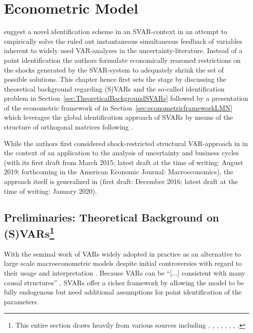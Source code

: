 \documentclass[a4paper,11pt,listof=nochaptergap,oneside,pointednumbers,bibtotoc,bigheadings,liststotoc,hidelinks]{scrbook}
\theoremstyle{mysatz}
\theoremstyle{mydefinition}
\theoremstyle{mytheorem}
\theoremstyle{mybemerkung}
\begin{document}
\chapter{Econometric Model}
\label{EconometricModel}
\citet{ludvigsonetal:18} suggest a novel identification scheme in an SVAR-context in an attempt to empirically solve the ruled out instantaneous simultaneous feedback of variables inherent to widely used VAR-analyses in the uncertainty-literature. Instead of a point identification the authors formulate economically reasoned restrictions on the shocks generated by the SVAR-system to adequately shrink the set of possible solutions. This chapter hence first sets the stage by discussing the theoretical background regarding (S)VARs and the so-called identification problem in Section~\ref{sec:TheoreticalBackgroundSVARs} followed by a presentation of the econometric framework of \citet{ludvigsonetal:18} in Section~\ref{sec:econometricframeworkLMN} which leverages the global identification approach of SVARs by means of the structure of orthogonal matrices following \citet{rubioetal:10}.

While the authors first considered shock-restricted structural VAR-approach in \citet{ludvigsonetal:18} in the context of an application to the analysis of uncertainty and business cycles (with its first draft from March 2015; latest draft at the time of writing: August 2019; forthcoming in the American Economic Journal: Macroeconomics), the approach itself is generalized in \citet{ludvigsonetal:17} (first draft: December 2016; latest draft at the time of writing: January 2020).

\section[Preliminaries: Theoretical Background on (S)VARs]{Preliminaries: Theoretical Background on (S)VARs\footnote{This entire section draws heavily from various sources including \citet{hamilton:94}, \citet{lutkepohl:05}, \citet{stockwatson:01}, \citet{villaramirez:10}, \citet{kunst:07}, \citet{whelan:16}, \citet{zivot:00}, \citet{foroni:14}.}}
With the seminal work of \citet{sims:80} VARs widely adopted in practice as an alternative to large scale macroeconometric models despite initial controversies with regard to their usage and interpretation \citep{canova:95, canova:95b}. Because VARs can be ``[...] consistent with many causal structures'' \citep[p. 1]{ludvigsonetal:17}, SVARs offer a richer framework by allowing the model to be fully endogenous but need additional assumptions for point identification of the parameters.
\end{document}
